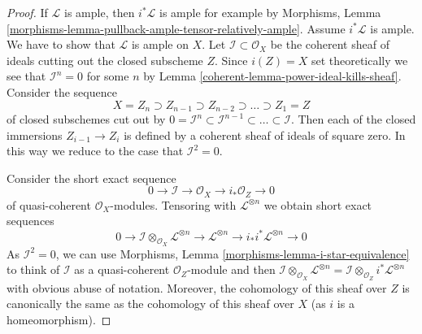 \begin{proof}

If $\mathcal{L}$ is ample, then $i^*\mathcal{L}$ is ample for
example by Morphisms, Lemma
\ref{morphisms-lemma-pullback-ample-tensor-relatively-ample}.
Assume $i^*\mathcal{L}$ is ample. We have to show that $\mathcal{L}$
is ample on $X$.
Let $\mathcal{I} \subset \mathcal{O}_X$ be the coherent sheaf of ideals
cutting out the closed subscheme $Z$. Since $i(Z) = X$ set theoretically
we see that $\mathcal{I}^n = 0$ for some $n$ by
Lemma \ref{coherent-lemma-power-ideal-kills-sheaf}.
Consider the sequence
$$
X = Z_n \supset Z_{n - 1} \supset Z_{n - 2} \supset \ldots \supset Z_1 = Z
$$
of closed subschemes cut out by
$0 = \mathcal{I}^n \subset \mathcal{I}^{n - 1} \subset \ldots \subset
\mathcal{I}$. Then each of the closed immersions $Z_{i - 1} \to Z_{i}$
is defined by a coherent sheaf of ideals of square zero. In this way
we reduce to the case that $\mathcal{I}^2 = 0$.

\medskip\noindent
Consider the short exact sequence
$$
0 \to \mathcal{I} \to \mathcal{O}_X \to i_*\mathcal{O}_Z \to 0
$$
of quasi-coherent $\mathcal{O}_X$-modules. Tensoring with
$\mathcal{L}^{\otimes n}$ we obtain short exact sequences
\begin{equation}
\label{equation-ses}
0 \to \mathcal{I} \otimes_{\mathcal{O}_X} \mathcal{L}^{\otimes n}
\to \mathcal{L}^{\otimes n} \to i_*i^*\mathcal{L}^{\otimes n} \to 0
\end{equation}
As $\mathcal{I}^2 = 0$, we can use
Morphisms, Lemma \ref{morphisms-lemma-i-star-equivalence}
to think of $\mathcal{I}$ as a quasi-coherent $\mathcal{O}_Z$-module
and then $\mathcal{I} \otimes_{\mathcal{O}_X} \mathcal{L}^{\otimes n} =
\mathcal{I} \otimes_{\mathcal{O}_Z} i^*\mathcal{L}^{\otimes n}$ with
obvious abuse of notation.
Moreover, the cohomology of this sheaf over $Z$ is canonically
the same as the cohomology of this sheaf over $X$ (as $i$ is a
homeomorphism).


\end{proof}
